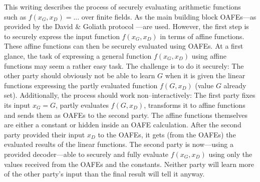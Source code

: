 \label{sec:introduction}

This writing describes the process of securely evaluating arithmetic functions
such as $f(x_G,x_D) = ...$ over finite fields.  As the main building block
OAFEs---as provided by the David \& Goliath protocol \cite{davidgoliath}---are
used. However, the first step is to securely express the input function $f(x_G,
x_D)$ in terms of affine functions. These affine functions can then be securely
evaluated using OAFEs. At a first glance, the task of expressing a general
function $f(x_G, x_D)$ using affine functions may seem a rather easy task. The
challenge is to do it securely: The other party should obviously not be able to
learn $G$ when it is given the linear functions expressing the partly evaluated
function $f(G, x_D)$ (value $G$ already set).  Additionally, the process should
work non--interactively: The first party fixes its input $x_G = G$, partly
evaluates $f(G, x_D)$, transforms it to affine functions and sends them as OAFEs
to the second party. The affine functions themselves are either a constant or
hidden inside an OAFE calculation. After the second party provided their input
$x_D$ to the OAFEs, it gets (from the OAFEs) the evaluated results of the linear
functions. The second party is now---using a provided decoder---able to securely
and fully evaluate $f(x_G, x_D)$ using only the values received from the OAFEs
and the constants. Neither party will learn more of the other party's input than
the final result will tell it anyway.

